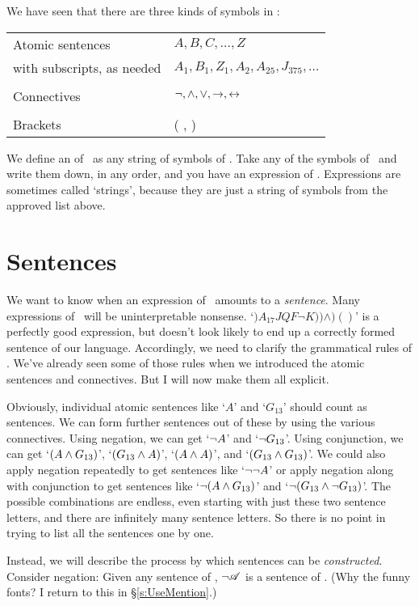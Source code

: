 We have seen that there are three kinds of symbols in \TFL:
\begin{center}
\begin{tabular}{l l} \toprule 
Atomic sentences & $A,B,C,…,Z$\\
with subscripts, as needed & $A_1, B_1,Z_1,A_2,A_{25},J_{375},…$\\
\\
Connectives & $\neg,\wedge,\vee,\rightarrow,\leftrightarrow$\\
\\
Brackets &( , )\\
\bottomrule \end{tabular} 
\end{center}
We define an  of \TFL\ as any string of symbols of \TFL. Take any of the symbols of \TFL\ and write them down, in any order, and you have an expression of \TFL. Expressions are sometimes called `strings', because they are just a string of symbols from the approved list above.


\section{Sentences}\label{s.sentencesTFL}
We want to know when an expression of \TFL\ amounts to a \emph{sentence}. Many expressions of \TFL\ will be uninterpretable nonsense. `$)A_{17}JQF¬K))\wedge)()$' is a perfectly good expression, but doesn't look likely to end up a correctly formed sentence of our language.  Accordingly, we need to clarify the grammatical rules of \TFL. We've already seen some of those rules when we introduced the atomic sentences and connectives. But I will now make them all explicit. 

Obviously, individual atomic sentences like `$A$' and `$G_{13}$' should count as sentences. We can form further sentences out of these by using the various connectives. Using negation, we can get `$\neg A$' and `$\neg G_{13}$'. Using conjunction, we can get `$(A \wedge G_{13})$', `$(G_{13} \wedge A)$', `$(A \wedge A)$', and `$(G_{13} \wedge G_{13})$'. We could also apply negation repeatedly to get sentences like `$\neg \neg A$' or apply negation along with conjunction to get sentences like `$\neg(A \wedge G_{13})$' and `$\neg(G_{13} \wedge \neg G_{13})$'. The possible combinations are endless, even starting with just these two sentence letters, and there are infinitely many sentence letters. So there is no point in trying to list all the sentences one by one.

Instead, we will describe the process by which sentences can be \emph{constructed}. Consider negation: Given any sentence  of \TFL, $\neg\mathscr{A}$ is a sentence of \TFL. (Why the funny fonts? I return to this in §\ref{s:UseMention}.)

